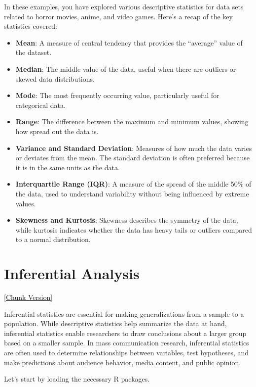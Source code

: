 \documentclass[
]{book}
\providecommand{\tightlist}{%
  \setlength{\itemsep}{0pt}\setlength{\parskip}{0pt}}
\begin{document}
In these examples, you have explored various descriptive statistics for data sets related to horror movies, anime, and video games. Here's a recap of the key statistics covered:

\begin{itemize}
\tightlist
\item
  \textbf{Mean}: A measure of central tendency that provides the ``average'' value of the dataset.
\item
  \textbf{Median}: The middle value of the data, useful when there are outliers or skewed data distributions.
\item
  \textbf{Mode}: The most frequently occurring value, particularly useful for categorical data.
\item
  \textbf{Range}: The difference between the maximum and minimum values, showing how spread out the data is.
\item
  \textbf{Variance and Standard Deviation}: Measures of how much the data varies or deviates from the mean. The standard deviation is often preferred because it is in the same units as the data.
\item
  \textbf{Interquartile Range (IQR)}: A measure of the spread of the middle 50\% of the data, used to understand variability without being influenced by extreme values.
\item
  \textbf{Skewness and Kurtosis}: Skewness describes the symmetry of the data, while kurtosis indicates whether the data has heavy tails or outliers compared to a normal distribution.
\end{itemize}

\chapter{Inferential Analysis}\label{inferential-analysis}

\href{_book/files/10-inferential_stats-chunk.Rmd}{{[}Chunk Version{]}}

Inferential statistics are essential for making generalizations from a sample to a population. While descriptive statistics help summarize the data at hand, inferential statistics enable researchers to draw conclusions about a larger group based on a smaller sample. In mass communication research, inferential statistics are often used to determine relationships between variables, test hypotheses, and make predictions about audience behavior, media content, and public opinion.

Let's start by loading the necessary R packages.
\end{document}
